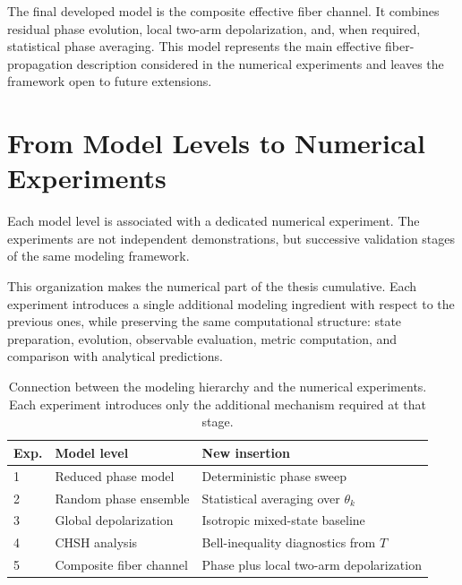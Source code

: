 \medskip

The final developed model is the composite effective fiber channel. It combines residual phase evolution, local two-arm depolarization, and, when required, statistical phase averaging. This model represents the main effective fiber-propagation description considered in the numerical experiments and leaves the framework open to future extensions.


\section{From Model Levels to Numerical Experiments}

Each model level is associated with a dedicated numerical experiment. The experiments are not independent demonstrations, but successive validation stages of the same modeling framework.

\medskip

This organization makes the numerical part of the thesis cumulative. Each experiment introduces a single additional modeling ingredient with respect to the previous ones, while preserving the same computational structure: state preparation, evolution, observable evaluation, metric computation, and comparison with analytical predictions.

\medskip

\begin{table}[htbp]
\centering
\small
\setlength{\tabcolsep}{4pt}
\begin{tabular}{lll}
\hline
\textbf{Exp.} & \textbf{Model level} & \textbf{New insertion} \\
\hline
1 & Reduced phase model & Deterministic phase sweep \\
2 & Random phase ensemble & Statistical averaging over \( \theta_k \) \\
3 & Global depolarization & Isotropic mixed-state baseline \\
4 & CHSH analysis & Bell-inequality diagnostics from \( T \) \\
5 & Composite fiber channel & Phase plus local two-arm depolarization \\
\hline
\end{tabular}
\caption{Connection between the modeling hierarchy and the numerical experiments. Each experiment introduces only the additional mechanism required at that stage.}
\label{tab:modeling_hierarchy_experiments}
\end{table}

